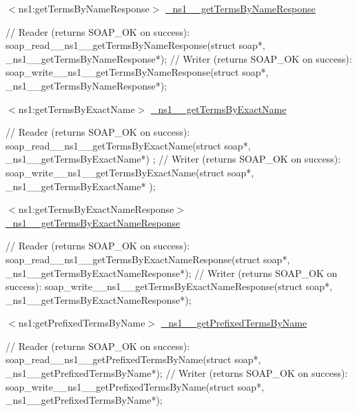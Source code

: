 \begin{DoxyItemize}
\item $<$ns1:getTermsByNameResponse$>$ \hyperlink{class__ns1____getTermsByNameResponse}{\_\-ns1\_\-\_\-getTermsByNameResponse} 
\begin{DoxyCode}
    // Reader (returns SOAP_OK on success):
    soap_read__ns1__getTermsByNameResponse(struct soap*, 
      _ns1__getTermsByNameResponse*);
    // Writer (returns SOAP_OK on success):
    soap_write__ns1__getTermsByNameResponse(struct soap*, 
      _ns1__getTermsByNameResponse*);
\end{DoxyCode}

\end{DoxyItemize}


\begin{DoxyItemize}
\item $<$ns1:getTermsByExactName$>$ \hyperlink{class__ns1____getTermsByExactName}{\_\-ns1\_\-\_\-getTermsByExactName} 
\begin{DoxyCode}
    // Reader (returns SOAP_OK on success):
    soap_read__ns1__getTermsByExactName(struct soap*, _ns1__getTermsByExactName*)
      ;
    // Writer (returns SOAP_OK on success):
    soap_write__ns1__getTermsByExactName(struct soap*, _ns1__getTermsByExactName*
      );
\end{DoxyCode}

\end{DoxyItemize}


\begin{DoxyItemize}
\item $<$ns1:getTermsByExactNameResponse$>$ \hyperlink{class__ns1____getTermsByExactNameResponse}{\_\-ns1\_\-\_\-getTermsByExactNameResponse} 
\begin{DoxyCode}
    // Reader (returns SOAP_OK on success):
    soap_read__ns1__getTermsByExactNameResponse(struct soap*, 
      _ns1__getTermsByExactNameResponse*);
    // Writer (returns SOAP_OK on success):
    soap_write__ns1__getTermsByExactNameResponse(struct soap*, 
      _ns1__getTermsByExactNameResponse*);
\end{DoxyCode}

\end{DoxyItemize}


\begin{DoxyItemize}
\item $<$ns1:getPrefixedTermsByName$>$ \hyperlink{class__ns1____getPrefixedTermsByName}{\_\-ns1\_\-\_\-getPrefixedTermsByName} 
\begin{DoxyCode}
    // Reader (returns SOAP_OK on success):
    soap_read__ns1__getPrefixedTermsByName(struct soap*, 
      _ns1__getPrefixedTermsByName*);
    // Writer (returns SOAP_OK on success):
    soap_write__ns1__getPrefixedTermsByName(struct soap*, 
      _ns1__getPrefixedTermsByName*);
\end{DoxyCode}

\end{DoxyItemize}



